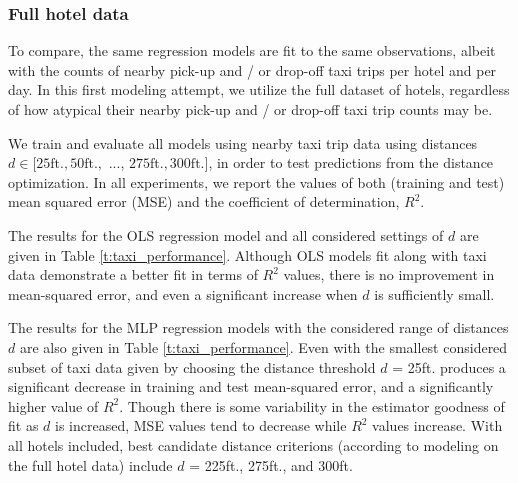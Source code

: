 \documentclass[useAMS, usenatbib]{biom}
\begin{document}
\subsubsection{Full hotel data}

To compare, the same regression models are fit to the same observations, albeit with the counts of nearby pick-up and / or drop-off taxi trips per hotel and per day. In this first modeling attempt, we utilize the full dataset of hotels, regardless of how atypical their nearby pick-up and / or drop-off taxi trip counts may be.

We train and evaluate all models using nearby taxi trip data using distances $d \in [25 \mathrm{ft.}, 50 \mathrm{ft.},$ ..., $275 \mathrm{ft.}, 300 \mathrm{ft.}]$, in order to test predictions from the distance optimization. In all experiments, we report the values of both (training and test) mean squared error (MSE) and the coefficient of determination, $R^2$.

The results for the OLS regression model and all considered settings of $d$ are given in Table \ref{t:taxi_performance}. Although OLS models fit along with taxi data demonstrate a better fit in terms of $R^2$ values, there is no improvement in mean-squared error, and even a significant increase when $d$ is sufficiently small.

The results for the MLP regression models with the considered range of distances $d$ are also given in Table \ref{t:taxi_performance}. Even with the smallest considered subset of taxi data given by choosing the distance threshold $d$ = 25ft. produces a significant decrease in training and test mean-squared error, and a significantly higher value of $R^2$. Though there is some variability in the estimator goodness of fit as $d$ is increased, MSE values tend to decrease while $R^2$ values increase. With all hotels included, best candidate distance criterions (according to modeling on the full hotel data) include $d$ = 225ft., 275ft., and 300ft.
\end{document}
